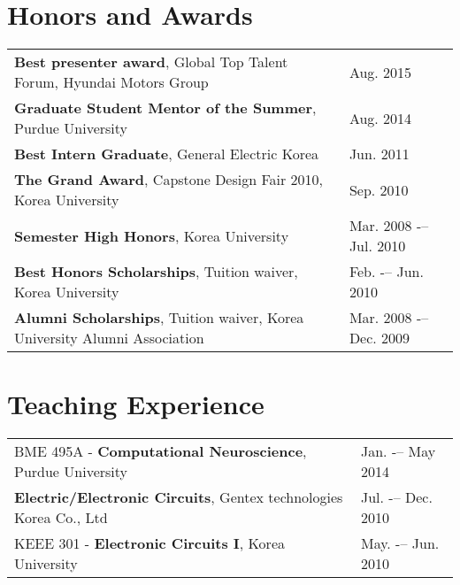 \documentclass[11pt]{article}
\begin{document}
\section*{Honors and Awards}
\begin{tabular}{L{0.74\textwidth} R{0.2\textwidth}}
  {\bf Best presenter award}, Global Top Talent Forum, Hyundai Motors Group        & Aug. 2015 \\ [0pt]
  {\bf Graduate Student Mentor of the Summer}, Purdue University                   & Aug. 2014 \\ [0pt]
  {\bf Best Intern Graduate}, General Electric Korea                               & Jun. 2011 \\ [0pt]
  {\bf The Grand Award}, Capstone Design Fair 2010, Korea University               & Sep. 2010 \\ [0pt]
  {\bf Semester High Honors}, Korea University                                     & Mar. 2008 -– Jul. 2010 \\ [0pt]
  {\bf Best Honors Scholarships}, Tuition waiver, Korea University                 & Feb. -– Jun. 2010 \\ [0pt]
  {\bf Alumni Scholarships}, Tuition waiver, Korea University Alumni Association   & Mar. 2008 -– Dec. 2009 \\ [0pt]
\end{tabular}
\vspace{-10pt}


\section*{Teaching Experience}
\begin{tabular}{L{0.74\textwidth} R{0.2\textwidth}}
  BME 495A - {\bf Computational Neuroscience}, Purdue University                   & Jan. -– May 2014 \\ [0pt]
  {\bf Electric/Electronic Circuits}, Gentex technologies Korea Co., Ltd           & Jul. -– Dec. 2010 \\ [0pt]
  KEEE 301 - {\bf Electronic Circuits I}, Korea University                         & May. -– Jun. 2010 \\ [0pt]
\end{tabular}
\vspace{-10pt}


\end{document}
